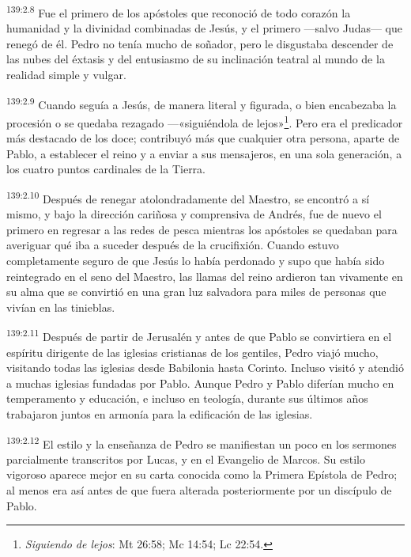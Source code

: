 \par
\textsuperscript{139:2.8} Fue el primero de los apóstoles que reconoció de todo corazón la humanidad y la divinidad combinadas de Jesús, y el primero ---salvo Judas--- que renegó de él. Pedro no tenía mucho de soñador, pero le disgustaba descender de las nubes del éxtasis y del entusiasmo de su inclinación teatral al mundo de la realidad simple y vulgar.

\par
\textsuperscript{139:2.9} Cuando seguía a Jesús, de manera literal y figurada, o bien encabezaba la procesión o se quedaba rezagado ---«siguiéndola de lejos»\footnote{\textit{Siguiendo de lejos}: Mt 26:58; Mc 14:54; Lc 22:54.}. Pero era el predicador más destacado de los doce; contribuyó más que cualquier otra persona, aparte de Pablo, a establecer el reino y a enviar a sus mensajeros, en una sola generación, a los cuatro puntos cardinales de la Tierra.

\par
\textsuperscript{139:2.10} Después de renegar atolondradamente del Maestro, se encontró a sí mismo, y bajo la dirección cariñosa y comprensiva de Andrés, fue de nuevo el primero en regresar a las redes de pesca mientras los apóstoles se quedaban para averiguar qué iba a suceder después de la crucifixión. Cuando estuvo completamente seguro de que Jesús lo había perdonado y supo que había sido reintegrado en el seno del Maestro, las llamas del reino ardieron tan vivamente en su alma que se convirtió en una gran luz salvadora para miles de personas que vivían en las tinieblas.

\par
\textsuperscript{139:2.11} Después de partir de Jerusalén y antes de que Pablo se convirtiera en el espíritu dirigente de las iglesias cristianas de los gentiles, Pedro viajó mucho, visitando todas las iglesias desde Babilonia hasta Corinto. Incluso visitó y atendió a muchas iglesias fundadas por Pablo. Aunque Pedro y Pablo diferían mucho en temperamento y educación, e incluso en teología, durante sus últimos años trabajaron juntos en armonía para la edificación de las iglesias.

\par
\textsuperscript{139:2.12} El estilo y la enseñanza de Pedro se manifiestan un poco en los sermones parcialmente transcritos por Lucas, y en el Evangelio de Marcos. Su estilo vigoroso aparece mejor en su carta conocida como la Primera Epístola de Pedro; al menos era así antes de que fuera alterada posteriormente por un discípulo de Pablo.

